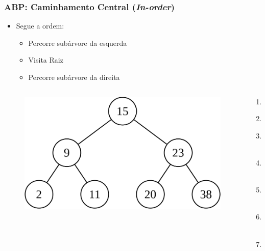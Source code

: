 \documentclass[aspectratio=169]{beamer}
\begin{document}
\begin{frame}\frametitle{ABP: Caminhamento Central (\emph{In-order})}
\begin{itemize}
	\item Segue a ordem:
	\begin{itemize}
		\item Percorre subárvore da esquerda
		\item Visita Raiz
		\item Percorre subárvore da direita
	\end{itemize}
\end{itemize}
\begin{columns}[T]
\begin{column}{0.7\linewidth}
\begin{figure}[h]
	\centering
	\includegraphics[height=0.3\paperheight]{imagens/abp02.png}
\end{figure}
\end{column}
\begin{column}{0.3\linewidth}
\pause
\begin{enumerate}
	\small
	\item 2
	\item 9
	\item 11
	\item 15
	\item 20
	\item 23
	\item 38
\end{enumerate}
\end{column}
\end{columns}
\end{frame}
\end{document}
